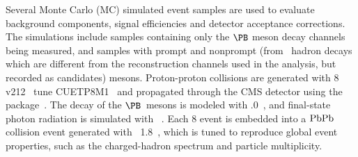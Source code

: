 \documentclass[11pt,twoside,a4paper,cmspaper]{cms-tdr}
\begin{document}
Several Monte Carlo (MC) simulated event samples are used to evaluate background components, signal efficiencies and detector acceptance corrections. The simulations include samples containing only the $\PB$ meson decay channels being measured, and samples with prompt and nonprompt \PJGy (from \PQb\ hadron decays which are different from the reconstruction channels used in the analysis, but recorded as candidates) mesons. Proton-proton collisions are generated with {\PYTHIA}8 v212~\cite{Sjostrand:2014zea} tune CUETP8M1~\cite{Khachatryan:2015pea} and propagated through the CMS detector using the \GEANTfour package~\cite{Allison:2016lfl}. The decay of the $\PB$~mesons is modeled with .0~\cite{Lange:2001uf}, and final-state photon radiation is simulated with ~\cite{Barberio:1990ms}. Each {\PYTHIA}8 event is embedded into a $\mathrm{PbPb}$ collision event generated with {\HYDJET}~1.8~\cite{Lokhtin:2005px}, which is tuned to reproduce global event properties, such as the charged-hadron \pt spectrum and particle multiplicity.
\end{document}
